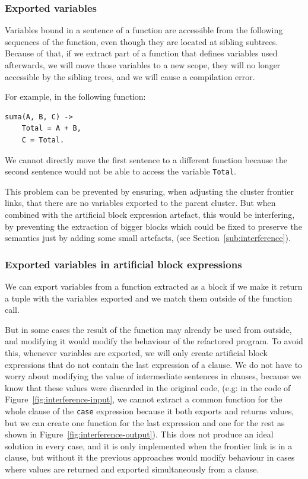\subsubsection{Exported variables}

Variables bound in a sentence of a function are accessible from the
following sequences of the function, even though they are located
at sibling subtrees. Because of that, if we extract part of a function
that defines variables used afterwards, we will move those variables
to a new scope, they will no longer accessible by the sibling trees,
and we will cause a compilation error.

For example, in the following function:

\begin{verbatim}
suma(A, B, C) ->
    Total = A + B,
    C = Total.
\end{verbatim}

We cannot directly move the first sentence to a different function
because the second sentence would not be able to access the variable
\texttt{Total}.

This problem can be prevented by ensuring, when adjusting the cluster
frontier links, that there are no variables exported to the parent cluster.
But when combined with the artificial block expression artefact, this
would be interfering, by preventing the extraction of bigger blocks
which could be fixed to preserve the semantics just by adding some
small artefacts, (see Section~\ref{sub:interference}).


\subsubsection{Exported variables in artificial block expressions\label{sub:interference}}

We can export variables from a function extracted as a block if we
make it return a tuple with the variables exported and we match them
outside of the function call.

But in some cases the result of the function may already be used from
outside, and modifying it would modify the behaviour of the refactored
program. To avoid this, whenever variables are exported, we will only
create artificial block expressions that do not contain the last expression
of a clause. We do not have to worry about modifying the value of
intermediate sentences in clauses, because we know that these values
were discarded in the original code, (e.g: in the code of Figure~\ref{fig:interference-input},
we cannot extract a common function for the whole clause of the \texttt{case}
expression because it both exports and returns values, but we can
create one function for the last expression and one for the rest as
shown in Figure~\ref{fig:interference-output}). This does not produce an ideal solution in every
case, and it is only implemented when the frontier link is in a clause,
but without it the previous approaches would modify behaviour in cases
where values are returned and exported simultaneously from a clause.

